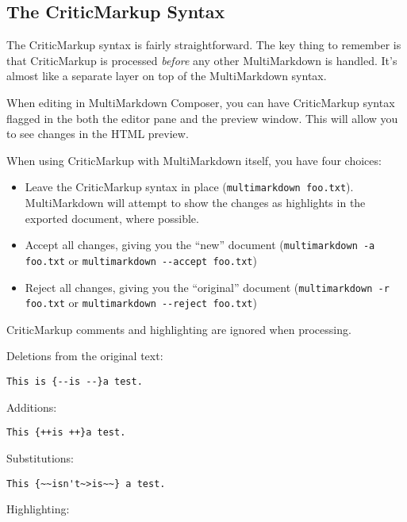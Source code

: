 \subsection{The CriticMarkup Syntax }
\label{thecriticmarkupsyntax}

The CriticMarkup syntax is fairly straightforward. The key thing to remember is that CriticMarkup is processed \emph{before} any other MultiMarkdown is handled. It's almost like a separate layer on top of the MultiMarkdown syntax.

When editing in MultiMarkdown Composer, you can have CriticMarkup syntax flagged in the both the editor pane and the preview window. This will allow you to see changes in the HTML preview.

When using CriticMarkup with MultiMarkdown itself, you have four choices:

\begin{itemize}
\item Leave the CriticMarkup syntax in place (\texttt{multimarkdown foo.txt}). MultiMarkdown will attempt to show the changes as highlights in the exported document, where possible.

\item Accept all changes, giving you the ``new'' document (\texttt{multimarkdown -a foo.txt} or \texttt{multimarkdown -{}-accept foo.txt})

\item Reject all changes, giving you the ``original'' document (\texttt{multimarkdown -r foo.txt} or \texttt{multimarkdown -{}-reject foo.txt})

\end{itemize}

CriticMarkup comments and highlighting are ignored when processing.

Deletions from the original text:

\begin{verbatim}
This is {--is --}a test.
\end{verbatim}

Additions:

\begin{verbatim}
This {++is ++}a test.
\end{verbatim}

Substitutions:

\begin{verbatim}
This {~~isn't~>is~~} a test.
\end{verbatim}

Highlighting:

